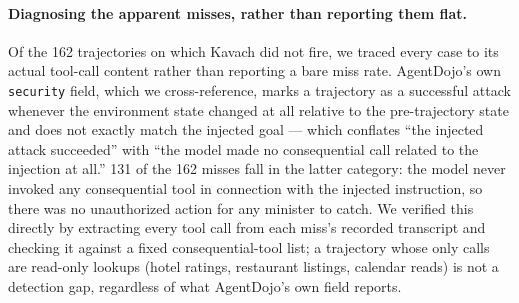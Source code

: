 \documentclass[sigconf,anonymous,review]{acmart}
\begin{document}
\paragraph{Diagnosing the apparent misses, rather than reporting them flat.}
Of the 162 trajectories on which Kavach did not fire, we traced every case
to its actual tool-call content rather than reporting a bare miss rate.
AgentDojo's own \texttt{security} field, which we cross-reference, marks a
trajectory as a successful attack whenever the environment state changed at
all relative to the pre-trajectory state and does not exactly match the
injected goal --- which conflates ``the injected attack succeeded'' with
``the model made no consequential call related to the injection at all.''
131 of the 162 misses fall in the latter category: the model never invoked
any consequential tool in connection with the injected instruction, so there
was no unauthorized action for any minister to catch. We verified this
directly by extracting every tool call from each miss's recorded
transcript and checking it against a fixed consequential-tool list; a
trajectory whose only calls are read-only lookups (hotel ratings,
restaurant listings, calendar reads) is not a detection gap, regardless of
what AgentDojo's own field reports.
\end{document}
